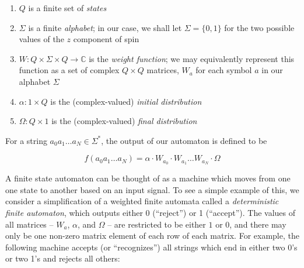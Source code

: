 \documentclass[12pt]{amsbook}
\theoremstyle{plain}
\theoremstyle{definition}
\theoremstyle{remark}
\newcommand{\eqn}[2][]{\begin{equation}\label{#1}#2\end{equation}}
\begin{document}
\begin{enumerate}
\item $Q$ is a finite set of \textit{states}
\item $\Sigma$ is a finite \textit{alphabet}; in our case, we shall let $\Sigma=\{0,1\}$ for the two possible values of the $z$ component of spin
\item $W:Q\times\Sigma\times Q\to \mathbb{C}$ is the \textit{weight function};  we may equivalently represent this function as a set of complex $Q\times Q$ matrices, $W_a$ for each symbol $a$ in our alphabet $\Sigma$
\item $\alpha:1\times Q$ is the (complex-valued) \textit{initial distribution}
\item $\Omega:Q\times 1$ is the (complex-valued) \textit{final distribution}
\end{enumerate}

For a string $a_0a_1\dots a_N\in\Sigma^*$, the output of our automaton is defined to be

\eqn[wfa-compute-eqn]{f(a_0a_1\dots a_N) = \alpha \cdot W_{a_0} \cdot W_{a_1} \dots W_{a_N} \cdot \Omega}

A finite state automaton can be thought of as a machine which moves from one one state to another based on an input signal.  To see a simple example of this, we consider a simplification of a weighted finite automata called a \textit{deterministic finite automaton}, which outputs either 0 (``reject'') or 1 (``accept'').  The values of all matrices -- $W_a$, $\alpha$, and $\Omega$ -- are restricted to be either $1$ or $0$, and there may only be one non-zero matrix element of each row of each matrix.  For example, the following machine accepts (or ``recognizes'') all strings which end in either two 0's or two 1's and rejects all others:
\end{document}
